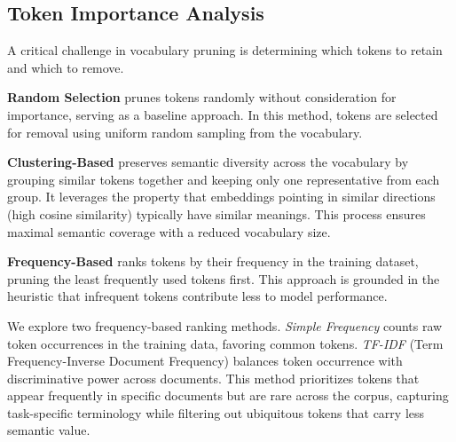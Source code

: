 \documentclass[twocolumn]{article}
\begin{document}

\subsection{Token Importance Analysis}
A critical challenge in vocabulary pruning is determining which tokens to retain and which to remove.

\textbf{Random Selection}
prunes tokens randomly without consideration for importance, serving as a baseline approach. In this method, tokens are selected for removal using uniform random sampling from the vocabulary.

\textbf{Clustering-Based}
preserves semantic diversity across the vocabulary by grouping similar tokens together and keeping only one representative from each group. It leverages the property that embeddings pointing in similar directions (high cosine similarity) typically have similar meanings\cite{mikolov2013efficient}. 
This process ensures maximal semantic coverage with a reduced vocabulary size.

\textbf{Frequency-Based} ranks tokens by their frequency in the training dataset, pruning the least frequently used tokens first. This approach is grounded in the heuristic that infrequent tokens contribute less to model performance.~\cite {li2024enhancing}

We explore two frequency-based ranking methods. 
\textit{Simple Frequency} counts raw token occurrences in the training data, favoring common tokens.
\textit{TF-IDF} (Term Frequency-Inverse Document Frequency) balances token occurrence with discriminative power across documents. This method prioritizes tokens that appear frequently in specific documents but are rare across the corpus, capturing task-specific terminology while filtering out ubiquitous tokens that carry less semantic value. 

\end{document}
